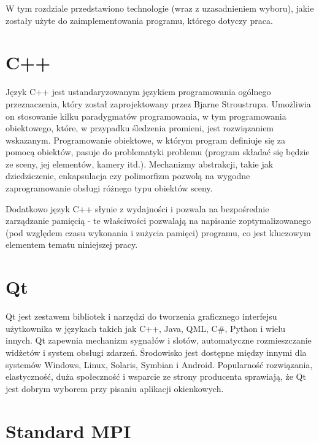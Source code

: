 W tym rozdziale przedstawiono technologie (wraz z uzasadnieniem wyboru), jakie zostały użyte do zaimplementowania programu, którego dotyczy praca.

\section{C++}

Język C++ jest ustandaryzowanym językiem programowania ogólnego przeznaczenia, który został zaprojektowany przez Bjarne Stroustrupa. Umożliwia on stosowanie kilku paradygmatów programowania, w tym programowania obiektowego, które, w przypadku śledzenia promieni, jest rozwiązaniem wskazanym. Programowanie obiektowe, w którym program definiuje się za pomocą obiektów, pasuje do problematyki problemu (program składać się będzie ze sceny, jej elementów, kamery itd.). Mechanizmy abstrakcji, takie jak dziedziczenie, enkapsulacja czy polimorfizm pozwolą na wygodne zaprogramowanie obsługi różnego typu obiektów sceny.

Dodatkowo język C++ słynie z wydajności i pozwala na bezpośrednie zarządzanie pamięcią - te właściwości pozwalają na napisanie zoptymalizowanego (pod względem czasu wykonania i zużycia pamięci) programu, co jest kluczowym elementem tematu niniejszej pracy. 

\section{Qt}

Qt jest zestawem bibliotek i narzędzi do tworzenia graficznego interfejsu użytkownika w językach takich jak C++, Java, QML, C\#, Python i wielu innych. Qt zapewnia mechanizm sygnałów i slotów, automatyczne rozmieszczanie widżetów i system obsługi zdarzeń. Środowisko jest dostępne między innymi dla systemów Windows, Linux, Solaris, Symbian i Android. Popularność rozwiązania, elastyczność, duża społeczność i wsparcie ze strony producenta \cite{qt} sprawiają, że Qt jest dobrym wyborem przy pisaniu aplikacji okienkowych.


\section{Standard MPI}

